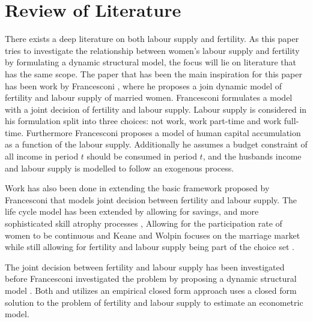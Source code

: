 \section{Review of Literature}\label{sec:lit_review}

There exists a deep literature on both labour supply and fertility.
As this paper tries to investigate the relationship between women's labour supply and fertility by formulating a dynamic  structural model, the focus will lie on literature that has the same scope. The paper that has been the main inspiration for this paper has been work by Francesconi \parencite{francesconi_joint_2002}, where he proposes a join dynamic model of fertility and labour supply of married women. Francesconi formulates a model with a joint decision of fertility and labour supply. Labour supply is considered in his formulation split into three choices: not work, work part-time and work full-time. Furthermore Francesconi proposes a model of human capital accumulation as a function of the labour supply. Additionally he assumes a budget constraint of all income in period $t$ should be consumed in period $t$, and the husbands income and labour supply is modelled to follow an exogenous process. 

Work has also been done in extending the basic framework proposed by Francesconi that models joint decision between fertility and labour supply.  The life cycle model has been extended by allowing for savings, and more sophisticated skill atrophy processes \parencite{adda_career_2011}, Allowing for the participation rate of women to be continuous \parencite{gayle_life-cyle_2006} and Keane and Wolpin focuses on the marriage market while still allowing for fertility and labour supply being part of the choice set \parencite{keane_role_2010}.

The joint decision between fertility and labour supply has been investigated before Francesconi investigated the problem by proposing a dynamic structural model \parencite{francesconi_joint_2002}. Both \parencite{moffitt_estimation_1984} and \parencite{hotz_empirical_1988} utilizes an empirical closed form approach uses a closed form solution to the problem of fertility and labour supply to estimate an econometric model. 